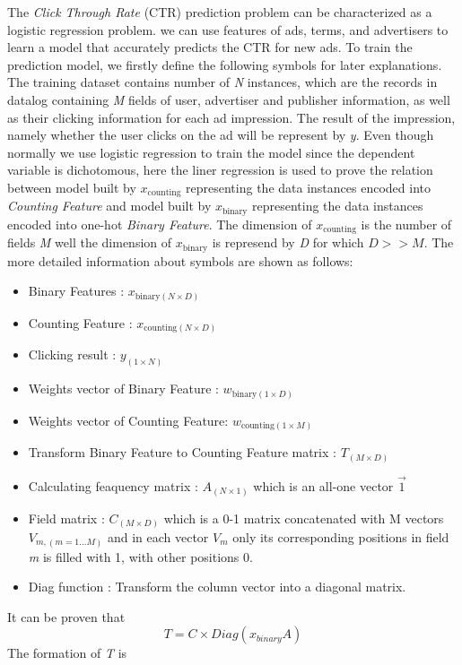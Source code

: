 \documentclass{sig-alternate}
\begin{document}
The \textsl{Click Through Rate} (CTR) prediction problem can be characterized as a logistic regression problem. we can use features of ads, terms, and advertisers to learn a model that accurately predicts the CTR for new ads. To train the prediction model, we firstly define the following symbols for later explanations.\vspace{5mm}
The training dataset contains number of \textsl{N} instances, which are the records in datalog containing \textsl{M} fields of user, advertiser and publisher information, as well as their clicking information for each ad impression. The result of the impression, namely whether the user clicks on the ad will be represent by \textsl{y}. Even though normally we use logistic regression to train the model since the dependent variable is dichotomous, here the liner regression is used to prove the relation between model built by \(x_{\text{counting}}\) representing the data instances encoded into \textsl{Counting Feature} and model built by \(x_{\text{binary}}\) representing the data instances encoded into one-hot \textsl{Binary Feature}. The dimension of \(x_{\text{counting}}\) is the number of fields \textsl{M} well the dimension of \(x_{\text{binary}}\) is represend by \textsl{D} for which \(D >> M\). The more detailed information about symbols are shown as follows:
\begin{itemize}
\item  Binary Features : \(x_{\text{binary}(N\times D)}\)
\item  Counting Feature : \(x_{\text{counting}(N\times D)}\)
\item  Clicking result : \(y_{(1\times N)}\)
\item  Weights vector of Binary Feature : \(w_{\text{binary}(1\times D)}\)
\item  Weights vector of Counting Feature: \(w_{\text{counting}(1\times M)}\)
\item  Transform Binary Feature to Counting Feature matrix : \(T_{(M\times D)}\)
\item  Calculating feaquency matrix : \(A_{(N\times 1)}\) which is an all-one vector 
$\vec{1 }$  
\item  Field  matrix : \(C_{(M\times D)}\) which is a 0-1 matrix concatenated with \textsl{}{M} vectors \(V_{m,(m = 1...M)}\) and in each vector \(V_m\) only its corresponding positions in field \textsl{m} is filled with 1, with other positions 0.
\item  Diag function : Transform the column vector into a diagonal matrix.\vspace{5mm} 

\end{itemize}
 It can be proven that 
\[ T = C\times Diag(x_{binary}A) \]
The formation of \textsl{T} is 
\end{document}
